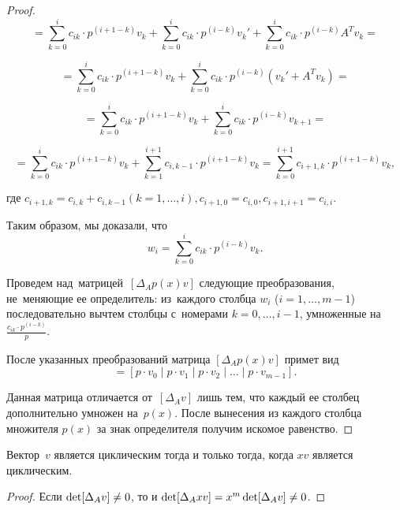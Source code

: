 \begin{proof}
\begin{equation*}
    = \sum\limits_{k = 0}^i c_{ik} \cdot p^{(i + 1 - k)} v_k +
    \sum\limits_{k = 0}^i c_{ik} \cdot p^{(i - k)} v_k' + \sum\limits_{k = 0}^i c_{ik} \cdot p^{(i - k)} A^T v_k =
\end{equation*}

\begin{equation*}
    = \sum\limits_{k = 0}^i c_{ik} \cdot p^{(i + 1 - k)} v_k +
    \sum\limits_{k = 0}^i c_{ik} \cdot p^{(i - k)} (v_k' + A^T v_k) =
\end{equation*}

\begin{equation*}
    = \sum\limits_{k = 0}^i c_{ik} \cdot p^{(i + 1 - k)} v_k +
    \sum\limits_{k = 0}^i c_{ik} \cdot p^{(i - k)} v_{k+1} =
\end{equation*}

\begin{equation*}
    = \sum\limits_{k = 0}^i c_{ik} \cdot p^{(i + 1 - k)} v_k +
    \sum\limits_{k = 1}^{i + 1} c_{i,k-1} \cdot p^{(i + 1 - k)} v_{k} =
    \sum\limits_{k = 0}^{i + 1} c_{i + 1,k} \cdot p^{(i + 1 - k)} v_k,
\end{equation*}

где $c_{i + 1,k} = c_{i,k} + c_{i,k - 1} (k = 1, \dots, i), c_{i+1,0} = c_{i,0}, c_{i+1,i+1} = c_{i,i}$.

Таким образом, мы доказали, что
\begin{equation*}
    w_i = \sum\limits_{k = 0}^i c_{ik} \cdot p^{(i - k)} v_k.
\end{equation*}

Проведем над~матрицей~$[\Delta_A p(x)v]$ следующие преобразования, не~меняющие ее определитель:
из~каждого столбца $w_{i}$ ($i = 1, \dots, m - 1$) последовательно вычтем столбцы с~номерами $k = 0, \dots, i - 1$,
умноженные на~$\frac{c_{ik} \cdot p^{(i - k)}}{p}$.

После указанных преобразований матрица $[\Delta_A p(x)v]$ примет вид
\begin{equation*}
    [\Delta_A p(x)v] = [p \cdot v_0 \mid p \cdot v_1 \mid p \cdot v_2 \mid \dots \mid p \cdot v_{m-1}].
\end{equation*}

Данная матрица отличается от~$[\Delta_A v]$ лишь тем, что каждый ее столбец дополнительно умножен на~$p(x)$.
После вынесения из каждого столбца множителя $p(x)$ за знак определителя получим искомое равенство.

\end{proof}

\begin{consequence}
Вектор~$v$ является циклическим тогда и только тогда, когда $x v$ является циклическим.
\end{consequence}

\begin{proof}
Если $\mathop{\rm det}[\Delta_A v] \neq 0$, то и $\mathop{\rm det}[\Delta_A xv] = x^{m}\mathop{\rm det}[\Delta_A v] \neq 0$.
\end{proof}